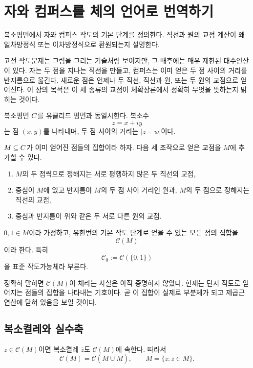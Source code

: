 \clearpage
\section{자와 컴퍼스를 체의 언어로 번역하기}
\label{sec:construction-geometric-model}

\begin{learninggoal}
복소평면에서 자와 컴퍼스 작도의 기본 단계를 정의한다. 직선과 원의 교점 계산이 왜 일차방정식 또는 이차방정식으로 환원되는지 설명한다.
\end{learninggoal}

고전 작도문제는 그림을 그리는 기술처럼 보이지만, 그 배후에는 매우 제한된 대수연산이 있다. 자는 두 점을 지나는 직선을 만들고, 컴퍼스는 이미 얻은 두 점 사이의 거리를 반지름으로 옮긴다. 새로운 점은 언제나 두 직선, 직선과 원, 또는 두 원의 교점으로 얻어진다. 이 장의 목적은 이 세 종류의 교점이 체확장론에서 정확히 무엇을 뜻하는지 밝히는 것이다.

복소평면 $C$를 유클리드 평면과 동일시한다. 복소수
\[
  z=x+iy
\]
는 점 $(x,y)$를 나타내며, 두 점 사이의 거리는 $|z-w|$이다.

\begin{definition}[기본 작도 단계]
$M\subseteq C$가 이미 얻어진 점들의 집합이라 하자. 다음 세 조작으로 얻은 교점을 $M$에 추가할 수 있다.
\begin{enumerate}[label=(\roman*)]
  \item $M$의 두 점씩으로 정해지는 서로 평행하지 않은 두 직선의 교점,
  \item 중심이 $M$에 있고 반지름이 $M$의 두 점 사이 거리인 원과, $M$의 두 점으로 정해지는 직선의 교점,
  \item 중심과 반지름이 위와 같은 두 서로 다른 원의 교점.
\end{enumerate}
$0,1\in M$이라 가정하고, 유한번의 기본 작도 단계로 얻을 수 있는 모든 점의 집합을
\[
  \mathcal C(M)
\]
이라 한다. 특히
\[
  \mathcal C_0:=\mathcal C(\{0,1\})
\]
을 표준 작도가능체라 부른다.
\end{definition}

정확히 말하면 $\mathcal C(M)$이 체라는 사실은 아직 증명하지 않았다. 현재는 단지 작도로 얻어지는 점들의 집합을 나타내는 기호이다. 곧 이 집합이 실제로 부분체가 되고 제곱근 연산에 닫혀 있음을 보일 것이다.

\subsection{복소켤레와 실수축}

\begin{proposition}
$z\in\mathcal C(M)$이면 복소켤레 $\overline z$도 $\mathcal C(M)$에 속한다. 따라서
\[
  \mathcal C(M)=\mathcal C(M\cup\overline M),
  \qquad
  \overline M=\{\overline z:z\in M\}.
\]
\end{proposition}

